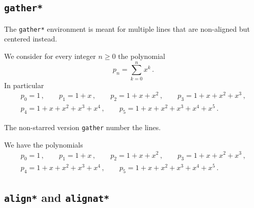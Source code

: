 \documentclass[a4paper, 10pt, abstract=on, headings=standardclasses]{scrartcl}
\begin{document}
\subsection{\texttt{gather*}}

The \texttt{gather*} environment is meant for multiple lines that are non-aligned but centered instead.
\begin{LTXexample}[pos = b]
  We consider for every integer $n \geq 0$ the polynomial
  \[
    p_n
    =
    \sum_{k=0}^n x^k \,.
  \]
  In particular
  \begin{gather*}
    p_0 = 1 \,,
    \qquad
    p_1 = 1 + x \,,
    \qquad
    p_2 = 1 + x + x^2 \,,
    \qquad
    p_3 = 1 + x + x^2 + x^3 \,,
    \\
    p_4 = 1 + x + x^2 + x^3 + x^4 \,,
    \qquad
    p_5 = 1 + x + x^2 + x^3 + x^4 + x^5 \,.
  \end{gather*}
\end{LTXexample}
The non-starred version \texttt{gather} number the lines.
\begin{LTXexample}[pos = b]
  We have the polynomials
  \begin{gather}
    p_0 = 1 \,,
    \qquad
    p_1 = 1 + x \,,
    \qquad
    p_2 = 1 + x + x^2 \,,
    \qquad
    p_3 = 1 + x + x^2 + x^3 \,,
    \\
    p_4 = 1 + x + x^2 + x^3 + x^4 \,,
    \qquad
    p_5 = 1 + x + x^2 + x^3 + x^4 + x^5 \,.
  \end{gather}
\end{LTXexample}



\subsection{\texttt{align*} and \texttt{alignat*}}
\end{document}

